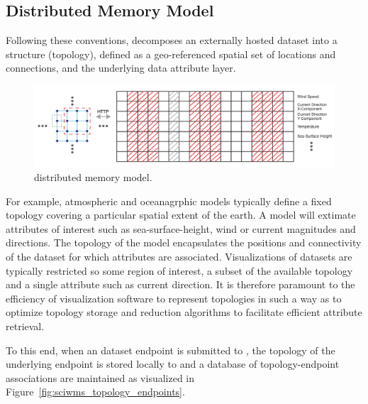 \subsection{Distributed Memory Model}

Following these conventions, \sciwms{} decomposes an externally hosted
dataset into a structure (topology), defined as a geo-referenced
spatial set of locations and connections, and the underlying data
attribute layer.

\begin{figure}[ht!]
  \centering
  \includegraphics[width=\textwidth]{../figs/topology_memModel}
  \caption{\sciwms{} distributed memory model.}
  \label{fig:sciwms_mem_model}
\end{figure}

For example, atmospheric and oceanagrphic models typically define a
fixed topology covering a particular spatial extent of the earth. A
model will extimate attributes of interest such as sea-surface-height,
wind or current magnitudes and directions. The topology of the model
encapsulates the positions and connectivity of the dataset for which
attributes are associated. Visualizations of datasets are typically
restricted so some region of interest, a subset of the available
topology and a single attribute such as current direction. It is
therefore paramount to the efficiency of visualization software to
represent topologies in such a way as to optimize topology storage and
reduction algorithms to facilitate efficient attribute retrieval.

To this end, when an dataset endpoint is submitted to \sciwms{}, the
topology of the underlying endpoint is stored locally to \sciwms{} and
a database of topology-endpoint associations are maintained as
visualized in Figure~\ref{fig:sciwms_topology_endpoints}. 

